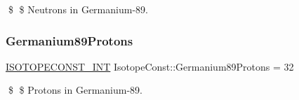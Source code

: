 \$ \$ Neutrons in Germanium-\/89. \mbox{\label{group___isotope_const-_germanium-_ge89_ga507020e6e80c7fea2ec17a4d6db7d0b8}} 
\subsubsection{\texorpdfstring{Germanium89\+Protons}{Germanium89Protons}}
{\footnotesize\ttfamily \mbox{\hyperlink{group___isotope_const-_macros_ga5f18360b3e99483a35c32d789e62621c}{I\+S\+O\+T\+O\+P\+E\+C\+O\+N\+S\+T\+\_\+\+I\+NT}} Isotope\+Const\+::\+Germanium89\+Protons = 32}

\$ \$ Protons in Germanium-\/89. 